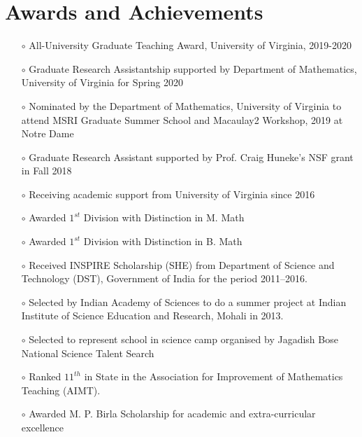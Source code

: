 \documentclass[12pt,a4paper,sans,english]{moderncv}        %
\begin{document}
\section{Awards and Achievements}
{
	\begin{itemize}
		\item[$\circ$] All-University Graduate Teaching Award, University of Virginia, 2019-2020
		
	\item[$\circ$] Graduate Research Assistantship supported by Department of Mathematics, University of Virginia for Spring 2020
		\item[$\circ$] Nominated by the Department of Mathematics, University of Virginia to attend MSRI Graduate Summer School and Macaulay2 Workshop, 2019 at Notre Dame
		\item[$\circ$] Graduate Research Assistant supported by Prof. Craig Huneke's NSF grant in Fall 2018
		\item[$\circ$] Receiving academic support from University of Virginia since 2016
		\item[$\circ$] Awarded $1^{st}$ Division with Distinction in M. Math
		\item[$\circ$] Awarded $1^{st}$ Division with Distinction in B. Math
		\item[$\circ$] Received INSPIRE Scholarship (SHE)  from Department of Science and Technology (DST), Government of India for the period 2011--2016.
		\item[$\circ$] Selected by Indian Academy of Sciences to do a summer project at Indian Institute of Science Education and Research, Mohali in 2013.
		\item[$\circ$] Selected to represent school in  science camp organised by Jagadish Bose National Science Talent Search
		\item[$\circ$] Ranked $11^{th}$ in State in the Association for Improvement of Mathematics Teaching (AIMT).
		\item[$\circ$] Awarded M. P. Birla Scholarship for academic and extra-curricular excellence
	\end{itemize}
}
\end{document}
